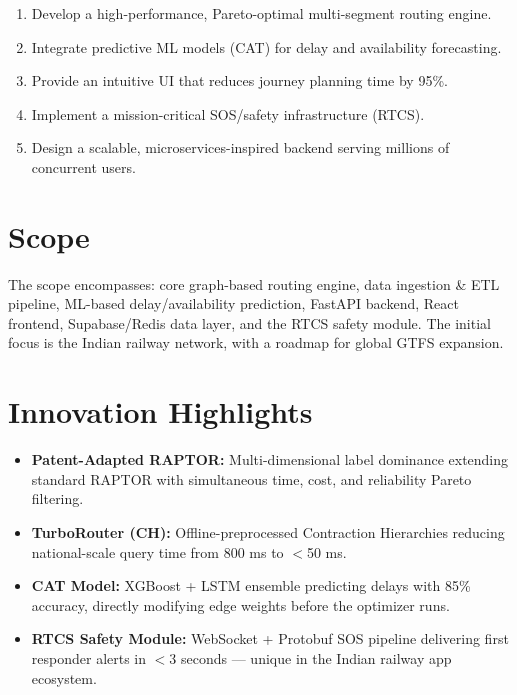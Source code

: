 \documentclass[12pt,a4paper]{report}
\begin{document}
\begin{enumerate}[leftmargin=1.5em]
  \item Develop a high-performance, Pareto-optimal multi-segment routing engine.
  \item Integrate predictive ML models (CAT) for delay and availability forecasting.
  \item Provide an intuitive UI that reduces journey planning time by 95\%.
  \item Implement a mission-critical SOS/safety infrastructure (RTCS).
  \item Design a scalable, microservices-inspired backend serving millions of concurrent users.
\end{enumerate}

\section{Scope}

The scope encompasses: core graph-based routing engine, data ingestion \& ETL pipeline, ML-based delay/availability prediction, FastAPI backend, React frontend, Supabase/Redis data layer, and the RTCS safety module. The initial focus is the Indian railway network, with a roadmap for global GTFS expansion.

\section{Innovation Highlights}

\begin{itemize}[leftmargin=1.5em]
  \item \textbf{Patent-Adapted RAPTOR:} Multi-dimensional label dominance extending standard RAPTOR with simultaneous time, cost, and reliability Pareto filtering.
  \item \textbf{TurboRouter (CH):} Offline-preprocessed Contraction Hierarchies reducing national-scale query time from 800 ms to $<$50 ms.
  \item \textbf{CAT Model:} XGBoost + LSTM ensemble predicting delays with 85\% accuracy, directly modifying edge weights before the optimizer runs.
  \item \textbf{RTCS Safety Module:} WebSocket + Protobuf SOS pipeline delivering first responder alerts in $<$3 seconds --- unique in the Indian railway app ecosystem.
\end{itemize}

\end{document}
